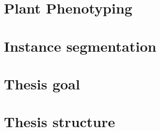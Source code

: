 


\section{Plant Phenotyping} %



\section{Instance segmentation}%



\section{Thesis goal}


\section{Thesis structure}
